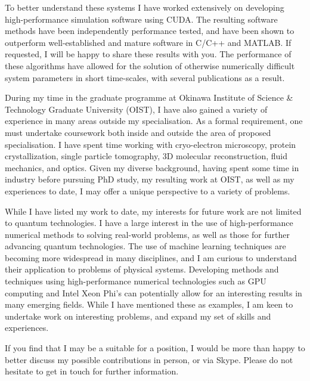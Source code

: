 \documentclass[12pt,a4paper,unicode]{moderncv}
\begin{document}
{    %

    To better understand these systems I have worked extensively on developing high-performance simulation software using CUDA. The resulting software methods have been independently performance tested, and have been shown to outperform well-established and mature software in C/C++ and \textsc{MATLAB}. If requested, I will be happy to share these results with you. The performance of these algorithms have allowed for the solution of otherwise numerically difficult system parameters in short time-scales, with several publications as a result.

    During my time in the graduate programme at Okinawa Institute of Science \& Technology Graduate University (OIST), I have also gained a variety of experience in many areas outside my specialisation. As a formal requirement, one must undertake coursework both inside and outside the area of proposed specialisation. I have spent time working with cryo-electron microscopy, protein crystallization, single particle tomography, 3D molecular reconstruction, fluid mechanics, and optics. Given my diverse background, having spent some time in industry before pursuing PhD study, my resulting work at OIST, as well as my experiences to date, I may offer a unique perspective to a variety of problems.

    While I have listed my work to date, my interests for future work are not limited to quantum technologies. I have a large interest in the use of high-performance numerical methods to solving real-world problems, as well as those for further advancing quantum technologies. The use of machine learning techniques are becoming more widespread in many disciplines, and I am curious to understand their application to problems of physical systems. Developing methods and techniques using high-performance numerical technologies such as GPU computing and Intel Xeon Phi's can potentially allow for an interesting results in many emerging fields. While I have mentioned these as examples, I am keen to undertake work on interesting problems, and expand my set of skills and experiences.


    If you find that I may be a suitable for a position, I would be more than happy to better discuss my possible contributions in person, or via Skype. Please do not hesitate to get in touch for further information.
}

\makeletterclosing
\end{document}
